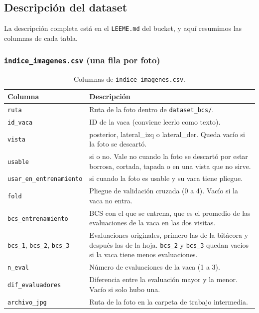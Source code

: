 \subsection{Descripción del dataset}\label{sec:descripcion}

La descripción completa está en el \nolinkurl{LEEME.md} del bucket, y aquí resumimos las columnas de cada tabla.

\subsubsection*{\texttt{indice\_imagenes.csv} (una fila por foto)}

\begin{table}[H]
  \centering
  \small
  \caption{Columnas de \texttt{indice\_imagenes.csv}.}
  \label{tab:col-indice}
  \begin{tabularx}{\textwidth}{>{\raggedright\arraybackslash}p{}>{\raggedright\arraybackslash}X}
    \toprule
    Columna & Descripción \\
    \midrule
    \texttt{ruta} & Ruta de la foto dentro de \nolinkurl{dataset_bcs/}. \\
    \texttt{id\_vaca} & ID de la vaca (conviene leerlo como texto). \\
    \texttt{vista} & posterior, lateral\_izq o lateral\_der. Queda vacío si la foto se descartó. \\
    \texttt{usable} & si o no. Vale no cuando la foto se descartó por estar borrosa, cortada, tapada o en una vista que no sirve. \\
    \texttt{usar\_en\_entrenamiento} & si cuando la foto es usable y su vaca tiene pliegue. \\
    \texttt{fold} & Pliegue de validación cruzada (0 a 4). Vacío si la vaca no entra. \\
    \texttt{bcs\_entrenamiento} & BCS con el que se entrena, que es el promedio de las evaluaciones de la vaca en las dos visitas. \\
    \texttt{bcs\_1}, \texttt{bcs\_2}, \texttt{bcs\_3} & Evaluaciones originales, primero las de la bitácora y después las de la hoja. \texttt{bcs\_2} y \texttt{bcs\_3} quedan vacíos si la vaca tiene menos evaluaciones. \\
    \texttt{n\_eval} & Número de evaluaciones de la vaca (1 a 3). \\
    \texttt{dif\_evaluadores} & Diferencia entre la evaluación mayor y la menor. Vacío si solo hubo una. \\
    \texttt{archivo\_jpg} & Ruta de la foto en la carpeta de trabajo intermedia. \\

\end{tabularx}
\end{table}
